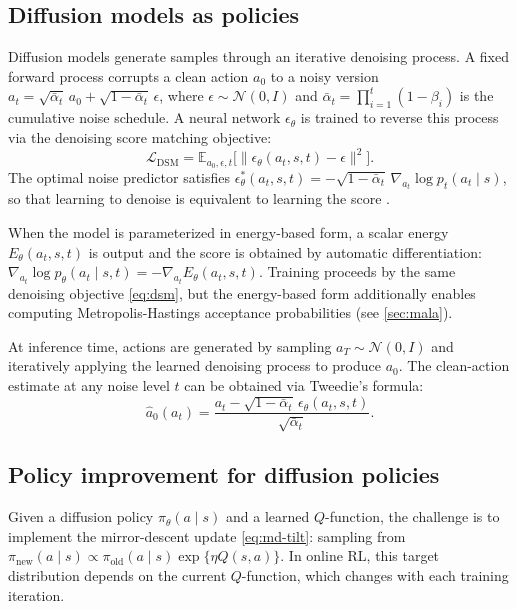 \documentclass{article}
\theoremstyle{plain}
\theoremstyle{definition}
\theoremstyle{remark}
\newcommand{\E}{\mathbb{E}}
\begin{document}
\subsection{Diffusion models as policies}
\label{sec:diffusion-background}

Diffusion models \citep{ho2020denoising,song2021sde} generate samples through an iterative denoising process.
A fixed forward process corrupts a clean action $a_0$ to a noisy version $a_t = \sqrt{\bar{\alpha}_t}\, a_0 + \sqrt{1-\bar{\alpha}_t}\, \epsilon$, where $\epsilon \sim \mathcal{N}(0,I)$ and $\bar{\alpha}_t = \prod_{i=1}^t (1-\beta_i)$ is the cumulative noise schedule.
A neural network $\epsilon_\theta$ is trained to reverse this process via the denoising score matching objective:
\begin{equation}
  \mathcal{L}_{\text{DSM}} = \E_{a_0, \epsilon, t}\bigl[\|\epsilon_\theta(a_t, s, t) - \epsilon\|^2\bigr].
  \label{eq:dsm}
\end{equation}
The optimal noise predictor satisfies $\epsilon_\theta^*(a_t, s, t) = -\sqrt{1{-}\bar{\alpha}_t}\, \nabla_{a_t} \log p_t(a_t \mid s)$, so that learning to denoise is equivalent to learning the score \citep{ho2020denoising}.

When the model is parameterized in energy-based form, a scalar energy $E_\theta(a_t, s, t)$ is output and the score is obtained by automatic differentiation: $\nabla_{a_t} \log p_\theta(a_t \mid s, t) = -\nabla_{a_t} E_\theta(a_t, s, t)$.
Training proceeds by the same denoising objective \cref{eq:dsm}, but the energy-based form additionally enables computing Metropolis-Hastings acceptance probabilities (see \cref{sec:mala}).

At inference time, actions are generated by sampling $a_T \sim \mathcal{N}(0,I)$ and iteratively applying the learned denoising process to produce $a_0$.
The clean-action estimate at any noise level $t$ can be obtained via Tweedie's formula:
\begin{equation}
  \hat{a}_0(a_t) = \frac{a_t - \sqrt{1-\bar{\alpha}_t}\, \epsilon_\theta(a_t, s, t)}{\sqrt{\bar{\alpha}_t}}.
  \label{eq:tweedie}
\end{equation}

\subsection{Policy improvement for diffusion policies}
\label{sec:policy-improvement-bg}

Given a diffusion policy $\pi_\theta(a \mid s)$ and a learned $Q$-function, the challenge is to implement the mirror-descent update \cref{eq:md-tilt}: sampling from $\pi_{\mathrm{new}}(a\mid s) \propto \pi_\mathrm{old}(a\mid s) \exp\{\eta Q(s,a)\}$.
In online RL, this target distribution depends on the current $Q$-function, which changes with each training iteration.
\end{document}
